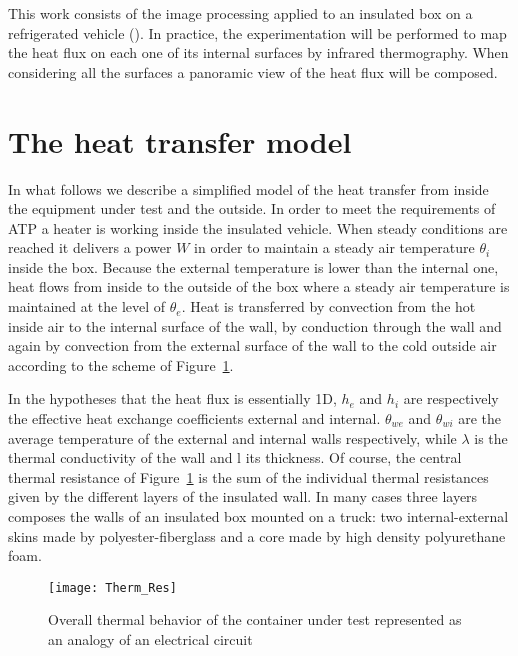 \documentclass{tQRT2e}
\begin{document}
This work consists of the image processing applied to an insulated box on a refrigerated vehicle (\cite{bison1993automatic,bison2012geometrical}). In practice, the experimentation will be performed to map the heat flux on each one of its internal surfaces by infrared thermography. When considering all the surfaces a panoramic view of the heat flux will be composed.


\section{The heat transfer model}

In what follows we describe a simplified model of the heat transfer from inside the equipment under test and the outside. In order to meet the requirements of ATP a heater is working inside the insulated vehicle. When steady conditions are reached it delivers a power $ W $ in order to maintain a steady air temperature $ \theta_i $ inside the box. Because the external temperature is lower than the internal one, heat flows from inside to the outside of the box where a steady air temperature is maintained at the level of $ \theta_e $. Heat is transferred by convection from the hot inside air to the internal surface of the wall, by conduction through the wall and again by convection from the external surface of the wall to the cold outside air according to the scheme of Figure~\ref{Therm_Res}. 

In the hypotheses that the heat flux is essentially 1D, $ h_e $ and $ h_i $ are respectively the effective heat exchange coefficients external and internal. $ \theta_{we} $ and $ \theta_{wi} $ are the average temperature of the external and internal walls respectively, while $\lambda $ is the thermal conductivity of the wall and l its thickness. Of course, the central thermal resistance of Figure~\ref{Therm_Res} is the sum of the individual thermal resistances given by the different layers of the insulated wall. In many cases three layers composes the walls of an insulated box mounted on a truck: two internal-external skins made by polyester-fiberglass and a core made by high density polyurethane foam.
\begin{figure}[ht]
	\centering
	\texttt{[image: Therm\_Res]}
	\caption{Overall thermal behavior of the container under test represented as an analogy of an electrical circuit}
	\label{Therm_Res}
\end{figure}
\end{document}
